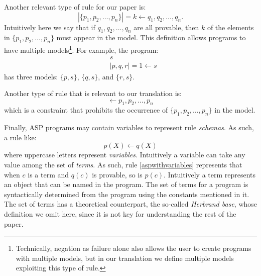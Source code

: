 Another relevant type of rule for our paper is:
\begin{equation*}
    |\{p_1,p_2,\ldots,p_n\}|=k \leftarrow q_1,q_2,\ldots,q_n.
\end{equation*}
Intuitively here we say that if $q_1,q_2,\ldots,q_n$ are all provable, then $k$ of the elements in $\{p_1,p_2,\ldots,p_n\}$ must appear in the model. This definition allows programs to have multiple models\footnote{Technically, negation as failure alone also allows the user to create programs with multiple models, but in our translation we define multiple models exploiting this type of rule.}. For example, the program:
\begin{align*}
    &s\\
    &|{p,q,r}|=1\leftarrow s
\end{align*}
has three models: $\{p,s\}$, $\{q,s\}$, and $\{r,s\}$.

Another type of rule that is relevant to our translation is:
\begin{equation}
    \leftarrow p_1,p_2,\ldots,p_n 
\end{equation}
which is a constraint that prohibits the occurrence of $\{p_1,p_2,\ldots,p_n\}$ in the model.

Finally, ASP programs may contain variables to represent rule \emph{schemas}. As such, a rule like:
\begin{equation}\label{aspwithvariables}
    p(X)\leftarrow q(X)
\end{equation}
where uppercase letters represent \emph{variables}. Intuitively a variable can take any value among the set of \emph{terms}. As such, rule \eqref{aspwithvariables} represents that when $c$ is a term and $q(c)$ is provable, so is $p(c)$. Intuitively a term represents an object that can be named in the program. The set of terms for a program is syntactically determined from the program using the constants mentioned in it. The set of terms has a theoretical counterpart, the so-called \emph{Herbrand base}, whose definition we omit here, since it is not key for understanding the rest of the paper. 

